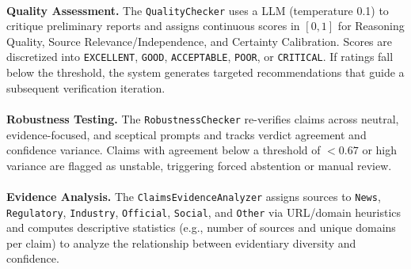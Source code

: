 ~\\
\textbf{Quality Assessment.} The \texttt{QualityChecker} uses a LLM (temperature 0.1) to critique preliminary reports and assigns continuous scores in $[0,1]$ for Reasoning Quality, Source Relevance/Independence, and Certainty Calibration. Scores are discretized into \texttt{EXCELLENT}, \texttt{GOOD}, \texttt{ACCEPTABLE}, \texttt{POOR}, or \texttt{CRITICAL}. If ratings fall below the threshold, the system generates targeted recommendations that guide a subsequent verification iteration.
\\
\\
\textbf{Robustness Testing.} The \texttt{RobustnessChecker} re-verifies claims across neutral, evidence-focused, and sceptical prompts and tracks verdict agreement and confidence variance. Claims with agreement below a threshold of $<0.67$ or high variance are flagged as unstable, triggering forced abstention or manual review.
\\
\\
\textbf{Evidence Analysis.} The \texttt{ClaimsEvidence\allowbreak Analyzer} assigns sources to \texttt{News}, \texttt{Regulatory}, \texttt{Industry}, \texttt{Official}, \texttt{Social}, and \texttt{Other} via URL/domain heuristics and computes descriptive statistics (e.g., number of sources and unique domains per claim) to analyze the relationship between evidentiary diversity and confidence.